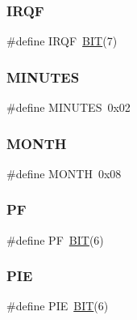 \mbox{\label{group__rtc_ga8565773f11252b9d615f1b12ac73032d}} 
\subsubsection{\texorpdfstring{I\+R\+QF}{IRQF}}
{\footnotesize\ttfamily \#define I\+R\+QF~\mbox{\hyperlink{group__vbe_ga3a8ea58898cb58fc96013383d39f482c}{B\+IT}}(7)}

\mbox{\label{group__rtc_ga84be9dcfa5a172ee83121620d15c8e29}} 
\subsubsection{\texorpdfstring{M\+I\+N\+U\+T\+ES}{MINUTES}}
{\footnotesize\ttfamily \#define M\+I\+N\+U\+T\+ES~0x02}

\mbox{\label{group__rtc_ga3729d06495d9713592f79f3122c9e677}} 
\subsubsection{\texorpdfstring{M\+O\+N\+TH}{MONTH}}
{\footnotesize\ttfamily \#define M\+O\+N\+TH~0x08}

\mbox{\label{group__rtc_gaa0e278c26c25558741febfadd7216caa}} 
\subsubsection{\texorpdfstring{PF}{PF}}
{\footnotesize\ttfamily \#define PF~\mbox{\hyperlink{group__vbe_ga3a8ea58898cb58fc96013383d39f482c}{B\+IT}}(6)}

\mbox{\label{group__rtc_gac40c2b49eb51e2adc237b530adfcadf4}} 
\subsubsection{\texorpdfstring{P\+IE}{PIE}}
{\footnotesize\ttfamily \#define P\+IE~\mbox{\hyperlink{group__vbe_ga3a8ea58898cb58fc96013383d39f482c}{B\+IT}}(6)}

